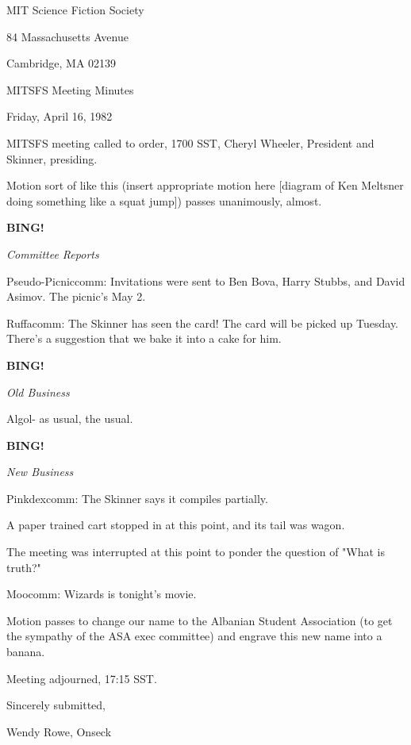 \documentclass[12pt]{article}
\newcommand{\bing}{{\bf BING!} }
\newcommand{\goto}[1]{\bing \vskip 12pt \centerline{{\em{#1}}}}
\begin{document}
\begin{center}

MIT Science Fiction Society 

84 Massachusetts Avenue

Cambridge, MA 02139

\vspace{12pt}

MITSFS Meeting Minutes 

Friday, April 16, 1982

\end{center}
 
\vspace{18pt}

\setlength{\parskip}{6pt}

\noindent
MITSFS meeting called to order, 1700 SST,
Cheryl Wheeler, President and Skinner, presiding.

Motion sort of like this (insert appropriate motion here [diagram of Ken Meltsner doing something like a squat jump]) passes unanimously, almost.

\goto{Committee Reports}

Pseudo-Picniccomm: Invitations were sent to Ben Bova, Harry Stubbs, and David Asimov. The picnic's May 2.

Ruffacomm: The Skinner has seen the card! The card will be picked up Tuesday. There's a suggestion that we bake it into a cake for him.

\goto{Old Business}

Algol- as usual, the usual.

\goto{New Business}

Pinkdexcomm: The Skinner says it compiles partially.

A paper trained cart stopped in at this point, and its tail was wagon.

The meeting was interrupted at this point to ponder the question of "What is truth?"

Moocomm: Wizards is tonight's movie.

Motion passes to change our name to the Albanian Student Association (to get the sympathy of the ASA exec committee) and engrave this new name into a banana.

\vspace{12pt}

\noindent
Meeting adjourned, 17:15 SST.

\vspace{18pt}

\centerline{Sincerely submitted,}
\centerline{Wendy Rowe, Onseck}
\end{document}
